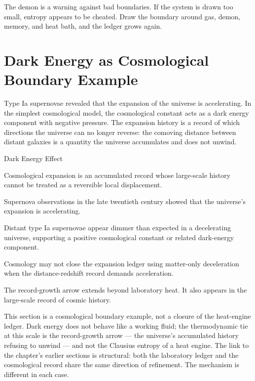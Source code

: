 The demon is a warning against bad boundaries. If the system is drawn too
small, entropy appears to be cheated. Draw the boundary around gas, demon,
memory, and heat bath, and the ledger grows again.

\section{Dark Energy as Cosmological Boundary Example}
\label{se:dark-energy}

Type Ia supernovae revealed that the expansion of the universe is accelerating.
In the simplest cosmological model, the cosmological constant acts as a dark
energy component with negative pressure. The expansion history is a record of
which directions the universe can no longer reverse: the comoving distance
between distant galaxies is a quantity the universe accumulates and does not
unwind.

\begin{phenom}{Dark Energy Effect}
\label{ph:dark-energy-effect}

\PhStatement Cosmological expansion is an accumulated record whose large-scale
history cannot be treated as a reversible local displacement.

\PhOrigin Supernova observations in the late twentieth century showed that the
universe's expansion is accelerating.

\PhObservation Distant type Ia supernovae appear dimmer than expected in a
decelerating universe, supporting a positive cosmological constant or related
dark-energy component.

\PhConstraint Cosmology may not close the expansion ledger using matter-only
deceleration when the distance-redshift record demands acceleration.

\PhConsequence The record-growth arrow extends beyond laboratory heat. It also
appears in the large-scale record of cosmic history.

\end{phenom}

This section is a cosmological boundary example, not a closure of the
heat-engine ledger. Dark energy does not behave like a working fluid;
the thermodynamic tie at this scale is the record-growth arrow --- the
universe's accumulated history refusing to unwind --- and not the
Clausius entropy of a heat engine. The link to the chapter's earlier
sections is structural: both the laboratory ledger and the cosmological
record share the same direction of refinement. The mechanism is
different in each case.

